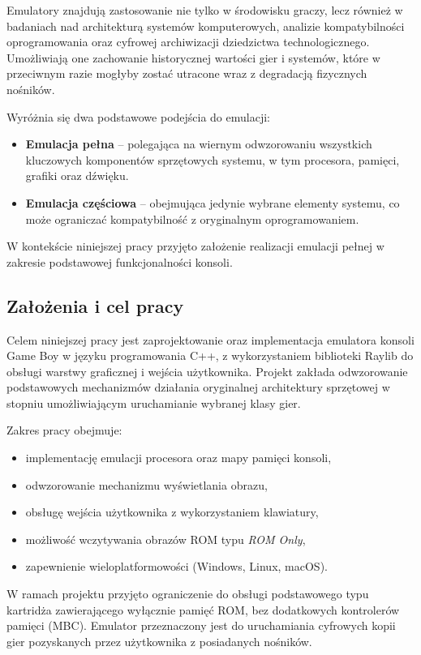 \documentclass{article}
\begin{document}
Emulatory znajdują zastosowanie nie tylko w środowisku graczy, lecz również w badaniach nad architekturą systemów komputerowych, analizie kompatybilności oprogramowania oraz cyfrowej archiwizacji dziedzictwa technologicznego. Umożliwiają one zachowanie historycznej wartości gier i systemów, które w przeciwnym razie mogłyby zostać utracone wraz z degradacją fizycznych nośników.

Wyróżnia się dwa podstawowe podejścia do emulacji:
\begin{itemize}
	\item \textbf{Emulacja pełna} – polegająca na wiernym odwzorowaniu wszystkich kluczowych komponentów sprzętowych systemu, w tym procesora, pamięci, grafiki oraz dźwięku.
	\item \textbf{Emulacja częściowa} – obejmująca jedynie wybrane elementy systemu, co może ograniczać kompatybilność z oryginalnym oprogramowaniem.
\end{itemize}

W kontekście niniejszej pracy przyjęto założenie realizacji emulacji pełnej w zakresie podstawowej funkcjonalności konsoli.

\subsection{Założenia i cel pracy}

Celem niniejszej pracy jest zaprojektowanie oraz implementacja emulatora konsoli Game Boy w języku programowania C++, z wykorzystaniem biblioteki Raylib do obsługi warstwy graficznej i wejścia użytkownika. Projekt zakłada odwzorowanie podstawowych mechanizmów działania oryginalnej architektury sprzętowej w stopniu umożliwiającym uruchamianie wybranej klasy gier.

Zakres pracy obejmuje:
\begin{itemize}
	\item implementację emulacji procesora oraz mapy pamięci konsoli,
	\item odwzorowanie mechanizmu wyświetlania obrazu,
	\item obsługę wejścia użytkownika z wykorzystaniem klawiatury,
	\item możliwość wczytywania obrazów ROM typu \textit{ROM Only},
	\item zapewnienie wieloplatformowości (Windows, Linux, macOS).
\end{itemize}

W ramach projektu przyjęto ograniczenie do obsługi podstawowego typu kartridża zawierającego wyłącznie pamięć ROM, bez dodatkowych kontrolerów pamięci (MBC). Emulator przeznaczony jest do uruchamiania cyfrowych kopii gier pozyskanych przez użytkownika z posiadanych nośników.
\end{document}
